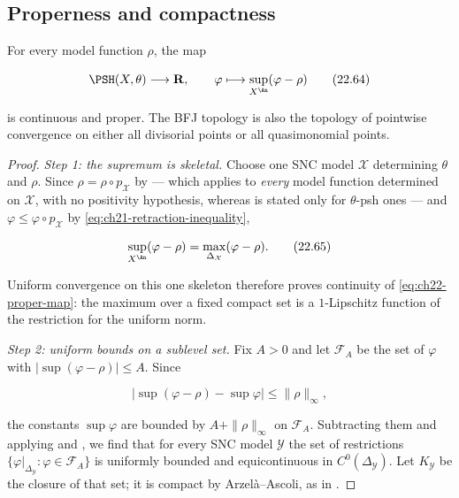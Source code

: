 \subsection{Properness and compactness}

\begin{theorem}\label{thm:ch22-proper-normalization}
For every model function $\rho$, the map

\[
 \PSH(X,\theta)\longrightarrow\mathbf R,
 \qquad
 \varphi\longmapsto\sup_{X^{\An}}(\varphi-\rho)
\tag{22.64}\label{eq:ch22-proper-map}
\]

is continuous and proper.  The BFJ topology is also the topology of
pointwise convergence on either all divisorial points or all quasimonomial
points.
\end{theorem}

\begin{proof}
\emph{Step 1: the supremum is skeletal.}  Choose one SNC model
$\mathcal X$ determining $\theta$ and $\rho$.  Since
$\rho=\rho\circ p_{\mathcal X}$ by
 --- which applies to \emph{every} model
function determined on $\mathcal X$, with no positivity hypothesis,
whereas  is stated only for
$\theta$-psh ones --- and
$\varphi\leq\varphi\circ p_{\mathcal X}$ by
\eqref{eq:ch21-retraction-inequality},

\[
 \sup_{X^{\An}}(\varphi-\rho)
 =\max_{\Delta_{\mathcal X}}(\varphi-\rho).
\tag{22.65}\label{eq:ch22-proper-map-skeletal}
\]

Uniform convergence on this one skeleton therefore proves continuity of
\eqref{eq:ch22-proper-map}: the maximum over a fixed compact set is a
$1$-Lipschitz function of the restriction for the uniform norm.

\emph{Step 2: uniform bounds on a sublevel set.}  Fix $A>0$ and let
$\mathcal F_A$ be the set of $\varphi$ with
$|\sup(\varphi-\rho)|\leq A$.  Since

\[
 \bigl|\sup(\varphi-\rho)-\sup\varphi\bigr|
       \leq\|\rho\|_{\infty},
\]

the constants $\sup\varphi$ are bounded by
$A+\|\rho\|_\infty$ on $\mathcal F_A$.  Subtracting them and applying
 and
, we find that for every SNC model
$\mathcal Y$ the set of restrictions
$\{\varphi|_{\Delta_{\mathcal Y}}:\varphi\in\mathcal F_A\}$ is uniformly
bounded and equicontinuous in $C^0(\Delta_{\mathcal Y})$.  Let
$K_{\mathcal Y}$ be the closure of that set; it is compact by
Arzel\`a--Ascoli, as in .


\end{proof}
